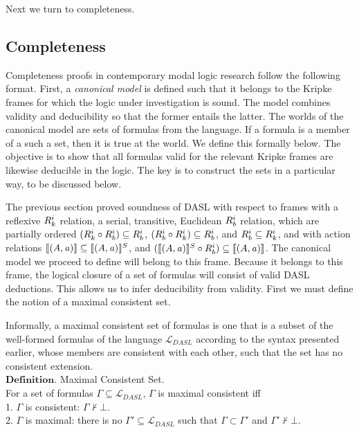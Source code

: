 Next we turn to completeness.

\subsection{Completeness}

Completeness proofs in contemporary modal logic research follow the following format. First, a \emph{canonical model} is defined such that it belongs to the Kripke frames for which the logic under investigation is sound. The model combines validity and deducibility so that the former entails the latter. The worlds of the canonical model are sets of formulas from the language. If a formula is a member of a such a set, then it is true at the world. We define this formally below. The objective is to show that all formulas valid for the relevant Kripke frames are likewise deducible in the logic. The key is to construct the sets in a particular way, to be discussed below.

The previous section proved soundness of DASL with respect to frames with a reflexive $R_{k}^i$ relation, a serial, transitive, Euclidean $R_{b}^i$ relation, which are partially ordered $(R_{k}^i \circ R_{b}^i) \subseteq R_{b}^i$, $(R_{b}^i \circ R_{k}^i) \subseteq R_{b}^i$, and $R_{b}^i \subseteq R_{k}^i$, and with action relations  $\llbracket (A,\mathit{a})\rrbracket \subseteq \llbracket (A,\mathit{a})\rrbracket^S$, and $(\llbracket (A,\mathit{a})\rrbracket^S \circ R_{b}^i) \subseteq \llbracket (A,\mathit{a})\rrbracket$. The canonical model we proceed to define will belong to this frame. Because it belongs to this frame, the logical closure of a set of formulas will consist of valid DASL deductions. This allows us to infer deducibility from validity. First we must define the notion of a maximal consistent set.
 
Informally, a maximal consistent set of formulas is one that is a subset of the well-formed formulas of the language $\mathcal{L}_{DASL}$ according to the syntax presented earlier, whose members are consistent with each other, such that the set has no consistent extension. \\
$\mathbf{Definition}$. Maximal Consistent Set.\\
For a set of formulas $\Gamma \subseteq \mathcal{L}_{DASL}$, $\Gamma$ is maximal consistent iff\\
1. $\Gamma$ is consistent: $\Gamma \not \vdash \bot$.\\
2. $\Gamma$ is maximal: there is no $\Gamma'\subseteq\mathcal{L}_{DASL}$ such that $\Gamma \subset \Gamma'$ and $\Gamma'\not\vdash\bot$.\\

